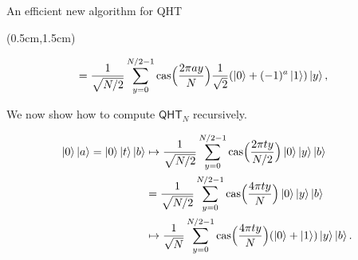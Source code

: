 \documentclass{beamer}
\theoremstyle{definition}
\newcommand{\cas}{\mathrm{cas}}
\newcommand{\qht}{\mathsf{QHT}}
\begin{document}
\begin{frame}{An efficient new algorithm for QHT}
    
    \begin{textblock*}{12cm}(0.5cm,1.5cm)
       
        \begin{align}
            & = \frac{1}{\sqrt{N / 2}} \sum_{y = 0}^{N / 2 - 1} \cas\Big( \frac{2\pi a y}{N} \Big) \frac{1}{\sqrt{2}} (\ket{0} + (-1)^a \ket{1}) \ket{y}, \label{eq:qht-alt} 
        \end{align}

        We now show how to compute $\qht_N$ recursively.

        \begin{align*}
            \ket{0}\ket{a} = \ket{0}\ket{t}\ket{b}
            & \mapsto \frac{1}{\sqrt{N / 2}} \sum_{y = 0}^{N / 2 - 1} \cas\Big( \frac{2\pi t y}{N / 2} \Big) \ket{0} \ket{y} \ket{b} \\%
            & = \frac{1}{\sqrt{N / 2}} \sum_{y = 0}^{N / 2 - 1} \cas\Big( \frac{4\pi t y}{N} \Big) \ket{0} \ket{y} \ket{b} \\
            & \mapsto \frac{1}{\sqrt{N}} \sum_{y = 0}^{N / 2 - 1} \cas\Big( \frac{4\pi t y}{N} \Big) (\ket{0} + \ket{1}) \ket{y}\ket{b}. %
        \end{align*}
        
    \end{textblock*}
    
\end{frame}



    
       
\end{document}
